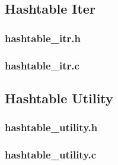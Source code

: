 \documentclass[letter,10pt]{article}
\begin{document}
\clearpage
\subsection{Hashtable Iter}
\subsubsection{hashtable\_itr.h}


\subsubsection{hashtable\_itr.c}


\clearpage
\subsection{Hashtable Utility}
\subsubsection{hashtable\_utility.h}


\subsubsection{hashtable\_utility.c}

\end{document}
